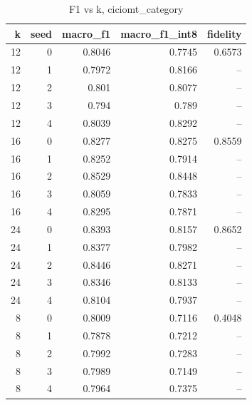\begin{table}
\caption{F1 vs k, ciciomt_category}
\begin{tabular}{rrrrr}
\toprule
k & seed & macro_f1 & macro_f1_int8 & fidelity \\
\midrule
12 & 0 & 0.8046 & 0.7745 & 0.6573 \\
12 & 1 & 0.7972 & 0.8166 & -- \\
12 & 2 & 0.801 & 0.8077 & -- \\
12 & 3 & 0.794 & 0.789 & -- \\
12 & 4 & 0.8039 & 0.8292 & -- \\
16 & 0 & 0.8277 & 0.8275 & 0.8559 \\
16 & 1 & 0.8252 & 0.7914 & -- \\
16 & 2 & 0.8529 & 0.8448 & -- \\
16 & 3 & 0.8059 & 0.7833 & -- \\
16 & 4 & 0.8295 & 0.7871 & -- \\
24 & 0 & 0.8393 & 0.8157 & 0.8652 \\
24 & 1 & 0.8377 & 0.7982 & -- \\
24 & 2 & 0.8446 & 0.8271 & -- \\
24 & 3 & 0.8346 & 0.8133 & -- \\
24 & 4 & 0.8104 & 0.7937 & -- \\
8 & 0 & 0.8009 & 0.7116 & 0.4048 \\
8 & 1 & 0.7878 & 0.7212 & -- \\
8 & 2 & 0.7992 & 0.7283 & -- \\
8 & 3 & 0.7989 & 0.7149 & -- \\
8 & 4 & 0.7964 & 0.7375 & -- \\
\bottomrule
\end{tabular}
\end{table}
